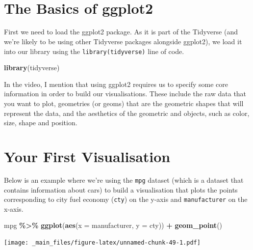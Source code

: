 \documentclass[
]{book}
\newenvironment{Shaded}{\begin{snugshade}}{\end{snugshade}}
\newcommand{\AttributeTok}[1]{\textcolor[rgb]{0.13,0.29,0.53}{#1}}
\newcommand{\FunctionTok}[1]{\textcolor[rgb]{0.13,0.29,0.53}{\textbf{#1}}}
\newcommand{\NormalTok}[1]{#1}
\newcommand{\SpecialCharTok}[1]{\textcolor[rgb]{0.81,0.36,0.00}{\textbf{#1}}}
\begin{document}
~~

~~

\hypertarget{the-basics-of-ggplot2}{%
\section{The Basics of ggplot2}\label{the-basics-of-ggplot2}}

First we need to load the ggplot2 package. As it is part of the Tidyverse (and we're likely to be using other Tidyverse packages alongside ggplot2), we load it into our library using the \texttt{library(tidyverse)} line of code.

\begin{Shaded}
\begin{Highlighting}[]
\FunctionTok{library}\NormalTok{(tidyverse)}
\end{Highlighting}
\end{Shaded}

In the video, I mention that using ggplot2 requires us to specify some core information in order to build our visualisations. These include the raw data that you want to plot, geometries (or geoms) that are the geometric shapes that will represent the data, and the aesthetics of the geometric and objects, such as color, size, shape and position.

\hypertarget{your-first-visualisation}{%
\section{Your First Visualisation}\label{your-first-visualisation}}

Below is an example where we're using the \texttt{mpg} dataset (which is a dataset that contains information about cars) to build a visualisation that plots the points corresponding to city fuel economy (\texttt{cty}) on the y-axis and \texttt{manufacturer} on the x-axis.

\begin{Shaded}
\begin{Highlighting}[]
\NormalTok{mpg }\SpecialCharTok{\%\textgreater{}\%}
  \FunctionTok{ggplot}\NormalTok{(}\FunctionTok{aes}\NormalTok{(}\AttributeTok{x =}\NormalTok{ manufacturer, }\AttributeTok{y =}\NormalTok{ cty)) }\SpecialCharTok{+} 
  \FunctionTok{geom\_point}\NormalTok{() }
\end{Highlighting}
\end{Shaded}

\texttt{[image: \_main\_files/figure-latex/unnamed-chunk-49-1.pdf]}
\end{document}
